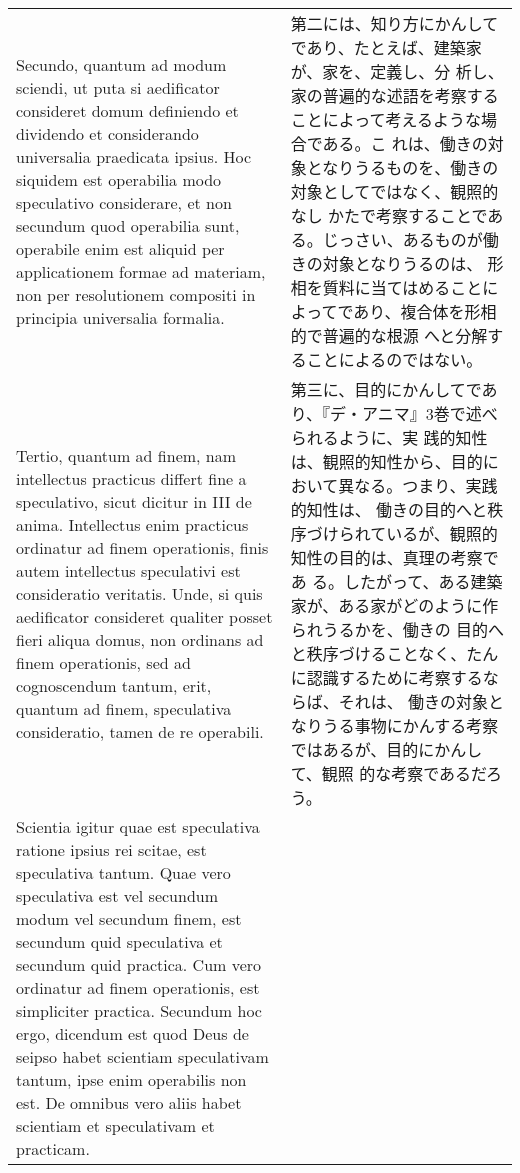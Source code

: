 \documentclass[10pt]{jsarticle} %
\begin{document}
\begin{longtable}{p{21em}p{21em}}
\\


Secundo, quantum ad modum sciendi, ut puta si aedificator consideret
domum definiendo et dividendo et considerando universalia praedicata
ipsius. Hoc siquidem est operabilia modo speculativo considerare, et
non secundum quod operabilia sunt, operabile enim est aliquid per
applicationem formae ad materiam, non per resolutionem compositi in
principia universalia formalia.


&

第二には、知り方にかんしてであり、たとえば、建築家が、家を、定義し、分
析し、家の普遍的な述語を考察することによって考えるような場合である。こ
れは、働きの対象となりうるものを、働きの対象としてではなく、観照的なし
かたで考察することである。じっさい、あるものが働きの対象となりうるのは、
形相を質料に当てはめることによってであり、複合体を形相的で普遍的な根源
へと分解することによるのではない。

\\


Tertio, quantum ad finem, nam intellectus practicus differt fine a
speculativo, sicut dicitur in III de anima. Intellectus enim practicus
ordinatur ad finem operationis, finis autem intellectus speculativi
est consideratio veritatis. Unde, si quis aedificator consideret
qualiter posset fieri aliqua domus, non ordinans ad finem operationis,
sed ad cognoscendum tantum, erit, quantum ad finem, speculativa
consideratio, tamen de re operabili.


&

第三に、目的にかんしてであり、『デ・アニマ』3巻で述べられるように、実
践的知性は、観照的知性から、目的において異なる。つまり、実践的知性は、
働きの目的へと秩序づけられているが、観照的知性の目的は、真理の考察であ
る。したがって、ある建築家が、ある家がどのように作られうるかを、働きの
目的へと秩序づけることなく、たんに認識するために考察するならば、それは、
働きの対象となりうる事物にかんする考察ではあるが、目的にかんして、観照
的な考察であるだろう。


\\


Scientia igitur quae est speculativa ratione ipsius rei scitae, est
speculativa tantum. Quae vero speculativa est vel secundum modum vel
secundum finem, est secundum quid speculativa et secundum quid
practica. Cum vero ordinatur ad finem operationis, est simpliciter
practica. Secundum hoc ergo, dicendum est quod Deus de seipso habet
scientiam speculativam tantum, ipse enim operabilis non est. De
omnibus vero aliis habet scientiam et speculativam et practicam.




\end{longtable}
\end{document}
